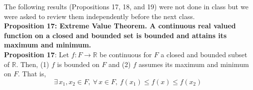 \documentclass[12pt]{article}
\newlength\tindent
\renewcommand{\indent}{\hspace*{\tindent}}
\newcommand{\R}{\mathbb R}
\begin{document}
\indent The following results (Propositions 17, 18, and 19) were not done in class but we were asked to review them independently before the next class. \\

%
%
{\bf Proposition 17: Extreme Value Theorem. A continuous real valued function on a closed and bounded set is bounded and attains its maximum and minimum.} \\

{\bf Proposition 17}: Let $f:F\to \R$ be continuous for $F$ a closed and bounded subset of $\R$. Then, (1) $f$ is bounded on $F$ and (2) $f$ assumes its maximum and minimum on $F$. That is, 
\begin{equation*}
	\exists\,x_1,x_2 \in F, ~ \forall\,x\in F,~f(x_1) \leq f(x) \leq f(x_2)
\end{equation*}
\end{document}
